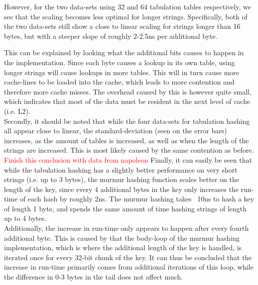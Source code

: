 \documentclass[11pt]{article} %
\begin{document}
However, for the two data-sets using 32 and 64 tabulation tables respectively, we see that the scaling becomes less optimal for longer strings. Specifically, both of the two data-sets still show a close to linear scaling for strings longer than 16 bytes, but with a steeper slope of roughly 2-2.5ns per additional byte. 

This can be explained by looking what the additional bits causes to happen in the implementation. Since each byte causes a lookup in its own table, using longer strings will cause lookups in more tables. This will in turn cause more cache-lines to be loaded into the cache, which leads to more contention and therefore more cache misses. The overhead caused by this is however quite small, which indicates that most of the data must be resident in the next level of cache (i.e. L2).\\

Secondly, it should be noted that while the four data-sets for tabulation hashing all appear close to linear, the standard-deviation (seen on the error bars) increases, as the amount of tables is increased, as well as when the length of the strings are increased. This is most likely caused by the same contention as before.\\

\textcolor{red}{Finish this conclusion with data from napoleon}
Finally, it can easily be seen that while the tabulation hashing has a slightly better performance on very short strings (i.e. up to 3 bytes), the murmur hashing function scales better on the length of the key, since every 4 additional bytes in the key only increases the run-time of each hash by roughly 2ns. The murmur hashing takes ~10ns to hash a key of length 1 byte, and spends the same amount of time hashing strings of length up to 4 bytes. \\

Additionally, the increase in run-time only appears to happen after every fourth additional byte. This is caused by that the body-loop of the murmur hashing implementation, which is where the additional length of the key is handled, is iterated once for every 32-bit chunk of the key. It can thus be concluded that the increase in run-time primarily comes from additional iterations of this loop, while the difference in 0-3 bytes in the tail does not affect much.
\end{document}
